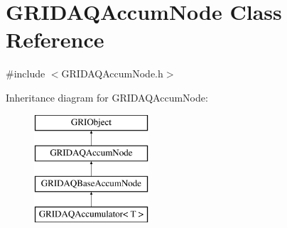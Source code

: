 \hypertarget{classGRIDAQAccumNode}{\section{\-G\-R\-I\-D\-A\-Q\-Accum\-Node \-Class \-Reference}
\label{classGRIDAQAccumNode}
}


{\ttfamily \#include $<$\-G\-R\-I\-D\-A\-Q\-Accum\-Node.\-h$>$}

\-Inheritance diagram for \-G\-R\-I\-D\-A\-Q\-Accum\-Node\-:\begin{figure}[H]
\begin{center}
\leavevmode
\includegraphics[height=4.000000cm]{classGRIDAQAccumNode}
\end{center}
\end{figure}
